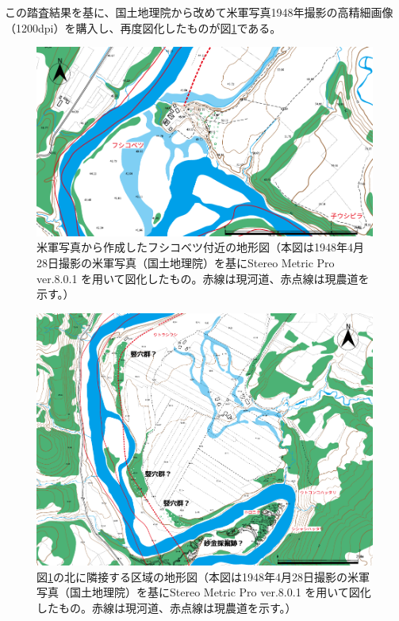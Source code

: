 \documentclass[a4j,11pt,twocolumn,openany]{jsbook}
\begin{document}
この踏査結果を基に、国土地理院から改めて米軍写真1948年撮影の高精細画像（1200dpi）を購入し、再度図化したものが図\ref{miya01fig}である。

\begin{figure}[ht]
	\centering
	\includegraphics[width=0.9\linewidth]{fig/05_Miyamoto/fig01.pdf}
	\captionsetup{format=hang,font=small,labelsep=quad,margin=30pt}
	\caption{米軍写真から作成したフシコベツ付近の地形図（本図は1948年4月28日撮影の米軍写真（国土地理院）を基にStereo Metric Pro ver.8.0.1 を用いて図化したもの。赤線は現河道、赤点線は現農道を示す。）}
	\label{miya01fig}
\end{figure}

\begin{figure}[ht]
	\vspace{-0.5\baselineskip}
	\centering
	\includegraphics[width=0.9\linewidth]{fig/05_Miyamoto/fig02.pdf}
	\captionsetup{format=hang,font=small,labelsep=quad,margin=30pt}
	\caption{
		図\ref{miya01fig}の北に隣接する区域の地形図（本図は1948年4月28日撮影の米軍写真（国土地理院）を基にStereo Metric Pro ver.8.0.1 を用いて図化したもの。赤線は現河道、赤点線は現農道を示す。）}
	\label{miya02fig}
\end{figure}
\end{document}
